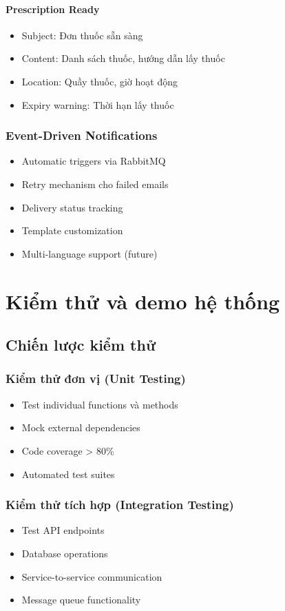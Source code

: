 \documentclass[12pt,a4paper]{report}
\begin{document}
\subsubsection{Prescription Ready}
\begin{itemize}
    \item Subject: Đơn thuốc sẵn sàng
    \item Content: Danh sách thuốc, hướng dẫn lấy thuốc
    \item Location: Quầy thuốc, giờ hoạt động
    \item Expiry warning: Thời hạn lấy thuốc
\end{itemize}

\subsection{Event-Driven Notifications}
\begin{itemize}
    \item Automatic triggers via RabbitMQ
    \item Retry mechanism cho failed emails
    \item Delivery status tracking
    \item Template customization
    \item Multi-language support (future)
\end{itemize}

\chapter{Kiểm thử và demo hệ thống}

\section{Chiến lược kiểm thử}

\subsection{Kiểm thử đơn vị (Unit Testing)}
\begin{itemize}
    \item Test individual functions và methods
    \item Mock external dependencies
    \item Code coverage > 80\%
    \item Automated test suites
\end{itemize}

\subsection{Kiểm thử tích hợp (Integration Testing)}
\begin{itemize}
    \item Test API endpoints
    \item Database operations
    \item Service-to-service communication
    \item Message queue functionality
\end{itemize}
\end{document}
